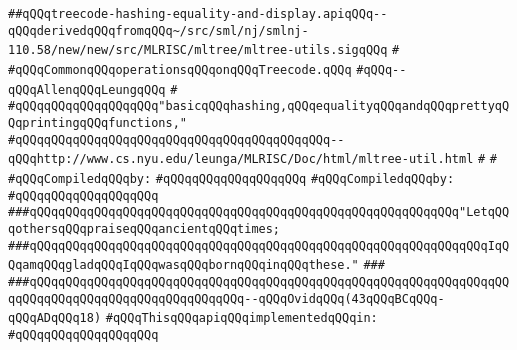 \label{src/lib/compiler/back/low/treecode/treecode-hashing-equality-and-display.api}
\verb|##qQQqtreecode-hashing-equality-and-display.apiqQQq--qQQqderivedqQQqfromqQQq~/src/sml/nj/smlnj-110.58/new/new/src/MLRISC/mltree/mltree-utils.sigqQQq|\newline
\verb|#|\newline
\verb|#qQQqCommonqQQqoperationsqQQqonqQQqTreecode.qQQq|\newline
\verb|#qQQq--qQQqAllenqQQqLeungqQQq|\newline
\verb|#|\newline
\verb|#qQQqqQQqqQQqqQQqqQQq"basicqQQqhashing,qQQqequalityqQQqandqQQqprettyqQQqprintingqQQqfunctions,"|\newline
\verb|#qQQqqQQqqQQqqQQqqQQqqQQqqQQqqQQqqQQqqQQqqQQq--qQQqhttp://www.cs.nyu.edu/leunga/MLRISC/Doc/html/mltree-util.html|\newline
\verb|#|\newline
\verb|#|\newline
\newline
\verb|#qQQqCompiledqQQqby:|\newline
\verb|#qQQqqQQqqQQqqQQqqQQq|\newline
\newline
\newline
\verb|#qQQqCompiledqQQqby:|\newline
\verb|#qQQqqQQqqQQqqQQqqQQq|\newline
\newline
\verb|###qQQqqQQqqQQqqQQqqQQqqQQqqQQqqQQqqQQqqQQqqQQqqQQqqQQqqQQqqQQq"LetqQQqothersqQQqpraiseqQQqancientqQQqtimes;|\newline
\verb|###qQQqqQQqqQQqqQQqqQQqqQQqqQQqqQQqqQQqqQQqqQQqqQQqqQQqqQQqqQQqqQQqIqQQqamqQQqgladqQQqIqQQqwasqQQqbornqQQqinqQQqthese."|\newline
\verb|###|\newline
\verb|###qQQqqQQqqQQqqQQqqQQqqQQqqQQqqQQqqQQqqQQqqQQqqQQqqQQqqQQqqQQqqQQqqQQqqQQqqQQqqQQqqQQqqQQqqQQqqQQqqQQq--qQQqOvidqQQq(43qQQqBCqQQq-qQQqADqQQq18)|\newline
\newline
\newline
\verb|#qQQqThisqQQqapiqQQqimplementedqQQqin:|\newline
\verb|#qQQqqQQqqQQqqQQqqQQq|\newline
